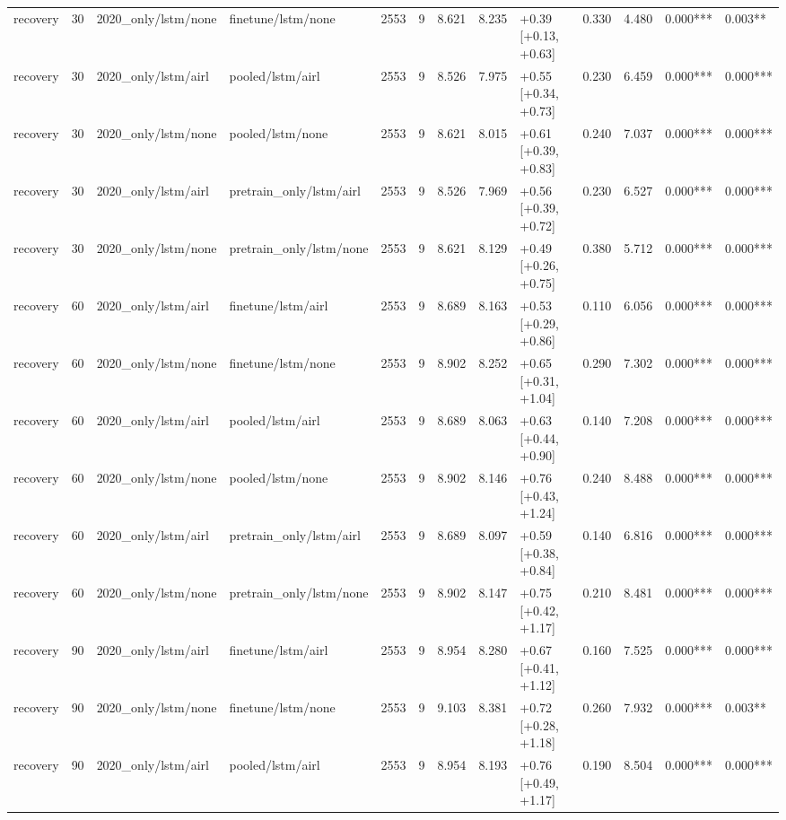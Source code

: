\begin{tabular}{lrllrrrrlrrll}
recovery & 30 & 2020_only/lstm/none & finetune/lstm/none & 2553 & 9 & 8.621 & 8.235 & +0.39 [+0.13, +0.63] & 0.330 & 4.480 & 0.000*** & 0.003** \\
recovery & 30 & 2020_only/lstm/airl & pooled/lstm/airl & 2553 & 9 & 8.526 & 7.975 & +0.55 [+0.34, +0.73] & 0.230 & 6.459 & 0.000*** & 0.000*** \\
recovery & 30 & 2020_only/lstm/none & pooled/lstm/none & 2553 & 9 & 8.621 & 8.015 & +0.61 [+0.39, +0.83] & 0.240 & 7.037 & 0.000*** & 0.000*** \\
recovery & 30 & 2020_only/lstm/airl & pretrain_only/lstm/airl & 2553 & 9 & 8.526 & 7.969 & +0.56 [+0.39, +0.72] & 0.230 & 6.527 & 0.000*** & 0.000*** \\
recovery & 30 & 2020_only/lstm/none & pretrain_only/lstm/none & 2553 & 9 & 8.621 & 8.129 & +0.49 [+0.26, +0.75] & 0.380 & 5.712 & 0.000*** & 0.000*** \\
recovery & 60 & 2020_only/lstm/airl & finetune/lstm/airl & 2553 & 9 & 8.689 & 8.163 & +0.53 [+0.29, +0.86] & 0.110 & 6.056 & 0.000*** & 0.000*** \\
recovery & 60 & 2020_only/lstm/none & finetune/lstm/none & 2553 & 9 & 8.902 & 8.252 & +0.65 [+0.31, +1.04] & 0.290 & 7.302 & 0.000*** & 0.000*** \\
recovery & 60 & 2020_only/lstm/airl & pooled/lstm/airl & 2553 & 9 & 8.689 & 8.063 & +0.63 [+0.44, +0.90] & 0.140 & 7.208 & 0.000*** & 0.000*** \\
recovery & 60 & 2020_only/lstm/none & pooled/lstm/none & 2553 & 9 & 8.902 & 8.146 & +0.76 [+0.43, +1.24] & 0.240 & 8.488 & 0.000*** & 0.000*** \\
recovery & 60 & 2020_only/lstm/airl & pretrain_only/lstm/airl & 2553 & 9 & 8.689 & 8.097 & +0.59 [+0.38, +0.84] & 0.140 & 6.816 & 0.000*** & 0.000*** \\
recovery & 60 & 2020_only/lstm/none & pretrain_only/lstm/none & 2553 & 9 & 8.902 & 8.147 & +0.75 [+0.42, +1.17] & 0.210 & 8.481 & 0.000*** & 0.000*** \\
recovery & 90 & 2020_only/lstm/airl & finetune/lstm/airl & 2553 & 9 & 8.954 & 8.280 & +0.67 [+0.41, +1.12] & 0.160 & 7.525 & 0.000*** & 0.000*** \\
recovery & 90 & 2020_only/lstm/none & finetune/lstm/none & 2553 & 9 & 9.103 & 8.381 & +0.72 [+0.28, +1.18] & 0.260 & 7.932 & 0.000*** & 0.003** \\
recovery & 90 & 2020_only/lstm/airl & pooled/lstm/airl & 2553 & 9 & 8.954 & 8.193 & +0.76 [+0.49, +1.17] & 0.190 & 8.504 & 0.000*** & 0.000*** \\

\end{tabular}
